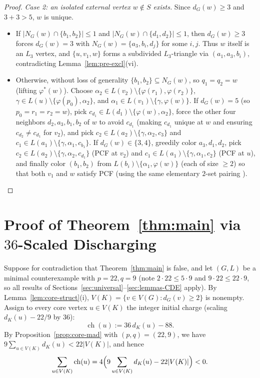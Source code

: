 \documentclass[11pt,a4paper]{article}
\theoremstyle{definition}
\newcommand{\ch}{\operatorname{ch}}
\newcommand{\code}[1]{\texttt{\detokenize{#1}}}
\begin{document}
\begin{proof}
\emph{Case 2: an isolated external vertex $w \notin S$ exists.} Since $d_G(w) \ge 3$ and $3 + 3 > 5$, $w$ is unique.
\begin{itemize}[leftmargin=*,itemsep=2pt]
  \item If $|N_G(w) \cap \{b_1, b_2\}| \le 1$ and $|N_G(w) \cap \{d_1, d_2\}| \le 1$, then $d_G(w) \ge 3$ forces $d_G(w) = 3$ with $N_G(w) = \{a_3, b_i, d_j\}$ for some $i, j$. Thus $w$ itself is an $L_3$ vertex, and $\{u, v_1, w\}$ forms a subdivided $L_3$-triangle via $(a_1, a_3, b_i)$, contradicting Lemma~\ref{lem:pre-excl}(vi).
  \item Otherwise, without loss of generality $\{b_1, b_2\} \subseteq N_G(w)$, so $q_1 = q_2 = w$ (lifting $\varphi^*(w)$). Choose $\alpha_2 \in L(v_2) \setminus \{\varphi(r_1), \varphi(r_2)\}$, $\gamma \in L(u) \setminus \{\varphi(p_0), \alpha_2\}$, and $\alpha_1 \in L(v_1) \setminus \{\gamma, \varphi(w)\}$. If $d_G(w) = 5$ (so $p_0 = r_1 = r_2 = w$), pick $c_{d_1} \in L(d_1) \setminus \{\varphi(w), \alpha_2\}$, force the other four neighbors $d_2, a_3, b_1, b_2$ of $w$ to avoid $c_{d_1}$ (making $c_{d_1}$ unique at $w$ and ensuring $c_{d_2} \neq c_{d_1}$ for $v_2$), and pick $c_2 \in L(a_2) \setminus \{\gamma, \alpha_2, c_3\}$ and $c_1 \in L(a_1) \setminus \{\gamma, \alpha_1, c_{b_1}\}$. If $d_G(w) \in \{3, 4\}$, greedily color $a_3, d_1, d_2$, pick $c_2 \in L(a_2) \setminus \{\gamma, \alpha_2, c_{d_1}\}$ (PCF at $v_2$) and $c_1 \in L(a_1) \setminus \{\gamma, \alpha_1, c_2\}$ (PCF at $u$), and finally color $(b_1, b_2)$ from $L(b_i) \setminus \{\alpha_1, \varphi(w)\}$ (each of size $\ge 2$) so that both $v_1$ and $w$ satisfy PCF (using the same elementary $2$-set pairing \code{pair_double_pcf}). \qedhere
\end{itemize}
\end{proof}

\section{Proof of Theorem~\ref{thm:main} via \texorpdfstring{$36$}{36}-Scaled Discharging}\label{sec:discharging}

Suppose for contradiction that Theorem~\ref{thm:main} is false, and let $(G, L)$ be a minimal counterexample with $p = 22, q = 9$ (note $2 \cdot 22 \le 5 \cdot 9$ and $9 \cdot 22 \le 22 \cdot 9$, so all results of Sections~\ref{sec:universal}--\ref{sec:lemmas-CDE} apply). By Lemma~\ref{lem:core-struct}(i), $V(K) = \{v \in V(G) : d_G(v) \ge 2\}$ is nonempty. Assign to every core vertex $u \in V(K)$ the integer initial charge (scaling $d_K(u) - 22/9$ by $36$):
\[
  \ch(u) := 36\, d_K(u) - 88.
\]
By Proposition~\ref{prop:core-mad} with $(p, q) = (22, 9)$, we have $9 \sum_{u \in V(K)} d_K(u) < 22|V(K)|$, and hence
\begin{equation}\label{eq:neg-sum}
  \sum_{u \in V(K)} \ch(u) = 4\Bigl(9 \sum_{u \in V(K)} d_K(u) - 22|V(K)|\Bigr) < 0.
\end{equation}
\end{document}
